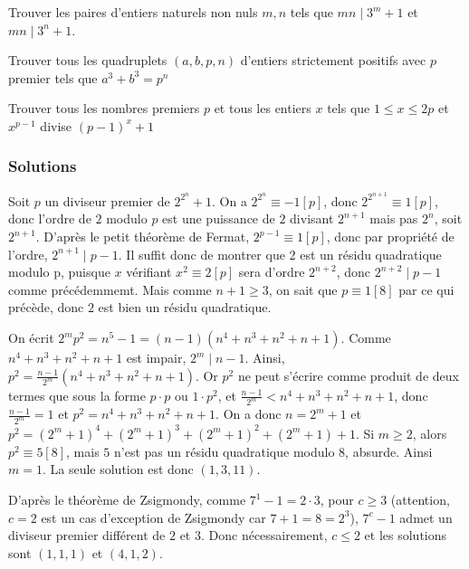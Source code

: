 \begin{exo}
Trouver les paires d'entiers naturels non nuls $m,n$ tels que $mn\mid 3^m+1$ et $mn\mid 3^n+1$.
\end{exo}


\begin{exo}[BxMO 2010, 4]
Trouver tous les quadruplets $(a,b,p,n)$ d'entiers strictement positifs avec $p$ premier tels que $a^3+b^3=p^n$
\end{exo}


\begin{exo}[IMO 1999, P4]
Trouver tous les nombres premiers $p$ et tous les entiers $x$ tels que $1\le x\le 2p$ et $x^{p-1}$ divise $(p-1)^x+1$
\end{exo}

\subsubsection{Solutions}


\begin{sol}
Soit $p$ un diviseur premier de $2^{2^n}+1$. On a $2^{2^n}\equiv -1[p]$, donc $2^{2^{n+1}}\equiv 1[p]$, donc l'ordre de $2$ modulo $p$ est une puissance de $2$ divisant $2^{n+1}$ mais pas $2^n$, soit $2^{n+1}$. D'après le petit théorème de Fermat, $2^{p-1}\equiv 1[p]$, donc par propriété de l'ordre, $2^{n+1}\mid p-1$. Il suffit donc de montrer que 2 est un résidu quadratique modulo p, puisque $x$ vérifiant $x^2\equiv 2[p]$ sera d'ordre $2^{n+2}$, donc $2^{n+2}\mid p-1$ comme précédemmemt. Mais comme $n+1\ge 3$, on sait que $p\equiv1[8]$ par ce qui précède, donc $2$ est bien un résidu quadratique.
\end{sol}


\begin{sol}
On écrit $2^m p^2 = n^5-1 = (n-1)(n^4+n^3+n^2+n+1)$. Comme $n^4+n^3+n^2+n+1$ est impair, $2^m\mid n-1$.
\newline Ainsi, $p^2 = \frac{n-1}{2^m} (n^4+n^3+n^2+n+1)$. Or $p^2$ ne peut s'écrire comme produit de deux termes que sous la forme $p\cdot p$ ou $1\cdot p^2$, et $\frac{n-1}{2^m} < n^4+n^3+n^2+n+1$, donc $\frac{n-1}{2^m} = 1$ et $p^2 = n^4+n^3+n^2+n+1$.
\newline On a donc $n = 2^m +1$ et $p^2 = (2^m +1)^4+(2^m +1)^3+(2^m +1)^2+(2^m +1)+1$. Si $m\ge 2$, alors $p^2\equiv 5[8]$, mais $5$ n'est pas un résidu quadratique modulo $8$, absurde. Ainsi $m=1$. La seule solution est donc $(1,3,11)$.
\end{sol}


\begin{sol}
D'après le théorème de Zsigmondy, comme $7^1-1=2\cdot 3$, pour $c\ge 3$ (attention, $c=2$ est un cas d'exception de Zsigmondy car $7+1=8=2^3$), $7^c-1$ admet un diviseur premier différent de $2$ et $3$. Donc nécessairement, $c\le 2$ et les solutions sont $(1,1,1)$ et $(4,1,2)$.
\end{sol}


